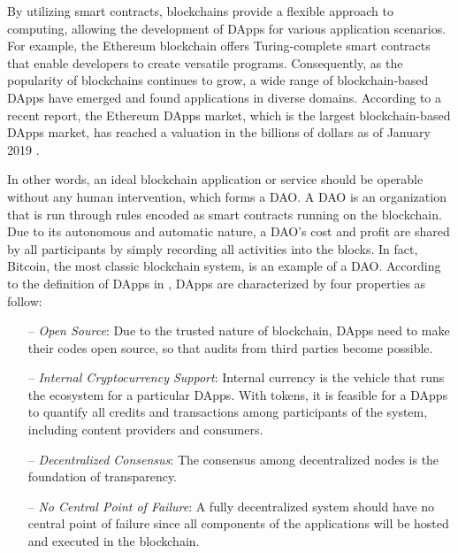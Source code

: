 By utilizing smart contracts, blockchains provide a flexible approach to computing, allowing the development of \ac{DApps} for various application scenarios. For example, the Ethereum blockchain offers Turing-complete smart contracts that enable developers to create versatile programs. Consequently, as the popularity of blockchains continues to grow, a wide range of blockchain-based \ac{DApps} have emerged and found applications in diverse domains. According to a recent report, the Ethereum \ac{DApps} market, which is the largest blockchain-based \ac{DApps} market, has reached a valuation in the billions of dollars as of January 2019 \cite{abdulhakeem2021powered}.

In other words,
an ideal blockchain application or service should be operable
without any human intervention, which forms a \ac{DAO}. A \ac{DAO} is an
organization that is run through rules encoded as smart contracts running on the blockchain. Due to its autonomous and
automatic nature, a \ac{DAO}’s cost and profit are shared by all
participants by simply recording all activities into the blocks.
In fact, Bitcoin, the most classic blockchain system, is an
example of a \ac{DAO}. According to the definition of \ac{DApps}
in \cite{raval2016decentralized}, \ac{DApps} are characterized by four properties as follow:
\begin{itemize}
    \item[--] \textit{Open Source}: Due to the trusted nature of blockchain,
\ac{DApps} need to make their codes open source, so that
audits from third parties become possible.
    \item[--] \textit{Internal Cryptocurrency Support}: Internal currency is
the vehicle that runs the ecosystem for a particular
\ac{DApps}. With tokens, it is feasible for a \ac{DApps} to quantify
all credits and transactions among participants of the
system, including content providers and consumers.
    \item[--] \textit{Decentralized Consensus}: The consensus among decentralized nodes is the foundation of transparency.
    \item[--] \textit{No Central Point of Failure}: A fully decentralized system should have no central point of failure since all components of the applications will be hosted and executed
in the blockchain.
\end{itemize}

